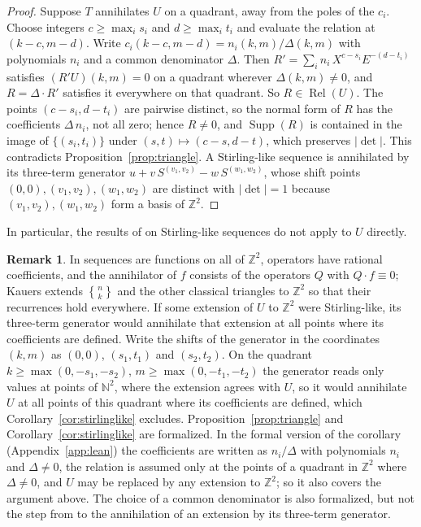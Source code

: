 \documentclass[11pt]{amsart}
\theoremstyle{definition}
\newtheorem{remark}[theorem]{Remark}
\newcommand{\stirling}[2]{\genfrac{\{}{\}}{0pt}{}{#1}{#2}}
\newcommand{\Z}{\mathbb{Z}}
\newcommand{\NN}{\mathbb{N}}
\DeclareMathOperator{\Rel}{Rel}
\DeclareMathOperator{\Supp}{Supp}
\begin{document}
\begin{proof}
Suppose $T$ annihilates $U$ on a quadrant, away from the poles of the $c_i$. Choose integers $c\ge\max_is_i$ and $d\ge\max_it_i$ and evaluate the relation at $(k-c,m-d)$. Write $c_i(k-c,m-d)=n_i(k,m)/\Delta(k,m)$ with polynomials $n_i$ and a common denominator $\Delta$. Then $R'=\sum_in_i\,X^{c-s_i}E^{-(d-t_i)}$ satisfies $(R'U)(k,m)=0$ on a quadrant wherever $\Delta(k,m)\ne0$, and $R=\Delta\cdot R'$ satisfies it everywhere on that quadrant. So $R\in\Rel(U)$. The points $(c-s_i,d-t_i)$ are pairwise distinct, so the normal form of $R$ has the coefficients $\Delta\,n_i$, not all zero; hence $R\ne0$, and $\Supp(R)$ is contained in the image of $\{(s_i,t_i)\}$ under $(s,t)\mapsto(c-s,d-t)$, which preserves $|\det|$. This contradicts Proposition~\ref{prop:triangle}. A Stirling-like sequence is annihilated by its three-term generator $u+v\,S^{(v_1,v_2)}-w\,S^{(w_1,w_2)}$, whose shift points $(0,0),(v_1,v_2),(w_1,w_2)$ are distinct with $|\det|=1$ because $(v_1,v_2),(w_1,w_2)$ form a basis of $\Z^2$.
\end{proof}

In particular, the results of \cite{Kauers07} on Stirling-like sequences do not apply to $U$ directly.

\begin{remark}\label{rem:kauers}
In \cite[Section~2.2]{Kauers07} sequences are functions on all of $\Z^2$, operators have rational coefficients, and the annihilator of $f$ consists of the operators $Q$ with $Q\cdot f\equiv0$; Kauers extends $\stirling{n}{k}$ and the other classical triangles to $\Z^2$ so that their recurrences hold everywhere. If some extension of $U$ to $\Z^2$ were Stirling-like, its three-term generator would annihilate that extension at all points where its coefficients are defined. Write the shifts of the generator in the coordinates $(k,m)$ as $(0,0)$, $(s_1,t_1)$ and $(s_2,t_2)$. On the quadrant $k\ge\max(0,-s_1,-s_2)$, $m\ge\max(0,-t_1,-t_2)$ the generator reads only values at points of $\NN^2$, where the extension agrees with $U$, so it would annihilate $U$ at all points of this quadrant where its coefficients are defined, which Corollary~\ref{cor:stirlinglike} excludes. Proposition~\ref{prop:triangle} and Corollary~\ref{cor:stirlinglike} are formalized. In the formal version of the corollary (Appendix~\ref{app:lean}) the coefficients are written as $n_i/\Delta$ with polynomials $n_i$ and $\Delta\ne0$, the relation is assumed only at the points of a quadrant in $\Z^2$ where $\Delta\ne0$, and $U$ may be replaced by any extension to $\Z^2$; so it also covers the argument above. The choice of a common denominator is also formalized, but not the step from \cite[Definition~3]{Kauers07} to the annihilation of an extension by its three-term generator.
\end{remark}
\end{document}
